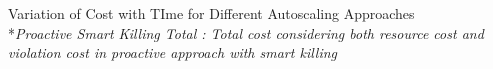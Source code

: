 Variation of Cost with TIme for Different Autoscaling Approaches \\
*\textit{Proactive Smart Killing Total : Total cost considering both resource cost and violation cost in proactive approach with smart killing}